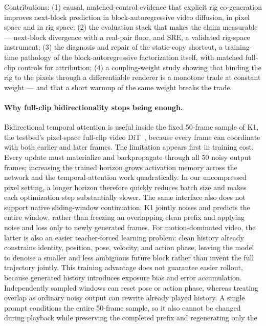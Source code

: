 \documentclass[10pt,twocolumn]{article}
\begin{document}
Contributions: (1) causal, matched-control evidence that explicit rig co-generation improves next-block prediction
in block-autoregressive video diffusion, in pixel space and in rig space; (2) the evaluation stack that makes the
claim measurable — next-block divergence with a real-pair floor, and SRE, a validated rig-space instrument;
(3) the diagnosis and repair of the static-copy shortcut, a training-time pathology of the block-autoregressive
factorization itself, with matched full-clip controls for attribution; (4) a coupling-weight study showing that
binding the rig to the pixels through a differentiable renderer is a monotone trade at constant weight — and that a
short warmup of the same weight breaks the trade.

\paragraph{Why full-clip bidirectionality stops being enough.} Bidirectional temporal attention is useful inside the fixed 50-frame sample of K1, the testbed's pixel-space full-clip video DiT~\cite{cho2026dsf}, because every frame can coordinate with both earlier and later frames. The limitation
appears first in training cost. Every update must materialize and backpropagate through all 50 noisy output frames;
increasing the trained horizon grows activation memory across the network and the temporal-attention work
quadratically. In our uncompressed pixel setting, a longer horizon therefore quickly reduces batch size and makes each
optimization step substantially slower. The same interface also does not support native sliding-window continuation:
K1 jointly noises and predicts the entire window, rather than freezing an overlapping clean prefix and applying noise
and loss only to newly generated frames. For motion-dominated video, the latter is also an easier teacher-forced
learning problem: clean history already constrains identity, position, pose, velocity, and action phase, leaving the
model to denoise a smaller and less ambiguous future block rather than invent the full trajectory jointly. This
training advantage does not guarantee easier rollout, because generated history introduces exposure bias and error
accumulation. Independently sampled windows can reset pose or action phase, whereas treating overlap as ordinary noisy
output can rewrite already played history. A single prompt conditions the entire 50-frame
sample, so it also cannot be changed during playback while preserving the completed prefix and regenerating only the
\end{document}
